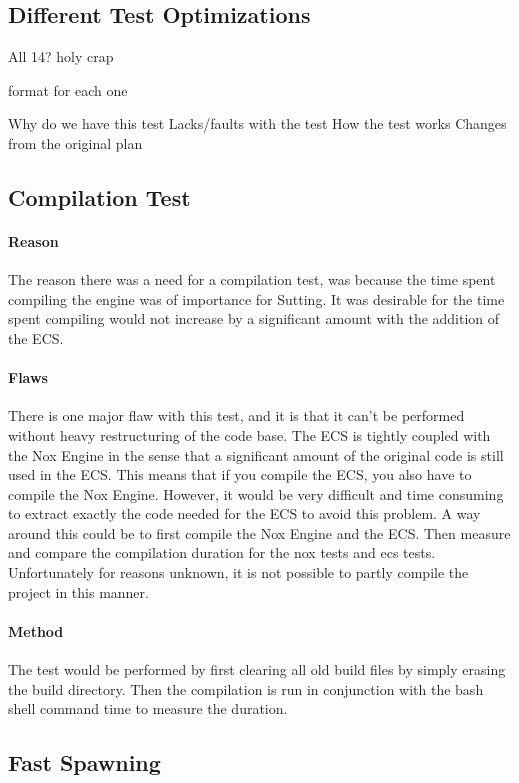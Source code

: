 \subsection{Different Test Optimizations}
All 14?
holy crap



format for each one

Why do we have this test
Lacks/faults with the test
How the test works
Changes from the original plan


\subsection{Compilation Test}

\paragraph{Reason}
The reason there was a need for a compilation test, was because the time spent compiling the engine was of importance for Sutting.
It was desirable for the time spent compiling would not increase by a significant amount with the addition of the ECS.

\paragraph{Flaws}
There is one major flaw with this test, and it is that it can't be performed without heavy restructuring of the code base.
The ECS is tightly coupled with the Nox Engine in the sense that a significant amount of the original code is still used in the ECS.
This means that if you compile the ECS, you also have to compile the Nox Engine.
However, it would be very difficult and time consuming to extract exactly the code needed for the ECS to avoid this problem.
A way around this could be to first compile the Nox Engine and the ECS.
Then measure and compare the compilation duration for the nox tests and ecs tests.
Unfortunately for reasons unknown, it is not possible to partly compile the project in this manner.

\paragraph{Method}
The test would be performed by first clearing all old build files by simply erasing the build directory.
Then the compilation is run in conjunction with the bash shell command time to measure the duration.

\subsection{Fast Spawning}
